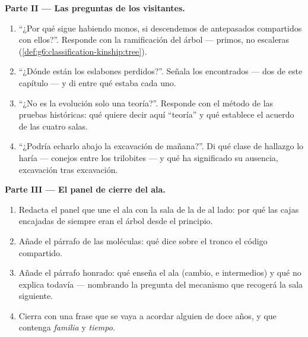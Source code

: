 \begin{problem}
\medskip\noindent\textbf{Parte II --- Las preguntas de los
visitantes.}
\begin{enumerate}[resume]
  \item ``¿Por qué sigue habiendo monos, si descendemos de antepasados
        compartidos con ellos?''. Responde con la ramificación del
        árbol --- primos, no escaleras
        (\cref{def:g6:classification-kinship:tree}).
  \item ``¿Dónde están los eslabones perdidos?''. Señala los
        encontrados --- dos de este capítulo --- y di entre qué estaba
        cada uno.
  \item ``¿No es la evolución solo una teoría?''. Responde con el
        método de las pruebas históricas: qué quiere decir aquí
        ``teoría'' y qué establece el acuerdo de las cuatro salas.
  \item ``¿Podría echarlo abajo la excavación de mañana?''. Di qué
        clase de hallazgo lo haría --- conejos entre los trilobites ---
        y qué ha significado su ausencia, excavación tras excavación.
\end{enumerate}

\medskip\noindent\textbf{Parte III --- El panel de cierre
del ala.}
\begin{enumerate}[resume]
  \item Redacta el panel que une el ala con la sala de la 
        de al lado: por qué las cajas encajadas de siempre eran el
        árbol desde el principio.
  \item Añade el párrafo de las moléculas: qué dice sobre el tronco el
        código compartido.
  \item Añade el párrafo honrado: qué enseña el ala (cambio, 
        e intermedios) y qué no explica todavía --- nombrando la
        pregunta del mecanismo que recogerá la sala siguiente.
  \item Cierra con una frase que se vaya a acordar alguien de doce
        años, y que contenga \emph{familia} y \emph{tiempo}.
\end{enumerate}
\end{problem}
